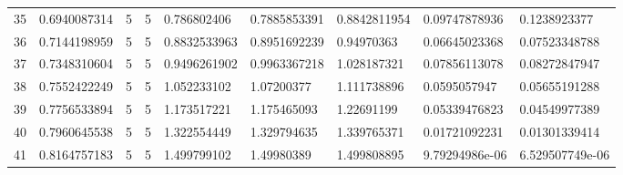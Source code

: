 \begin{tabular}{@{}lllllllll@{}}
35 & 0.6940087314 & 5 & 5 & 0.786802406 & 0.7885853391 & 0.8842811954 & 0.09747878936 & 0.1238923377 \\
36 & 0.7144198959 & 5 & 5 & 0.8832533963 & 0.8951692239 & 0.94970363 & 0.06645023368 & 0.07523348788 \\
37 & 0.7348310604 & 5 & 5 & 0.9496261902 & 0.9963367218 & 1.028187321 & 0.07856113078 & 0.08272847947 \\
38 & 0.7552422249 & 5 & 5 & 1.052233102 & 1.07200377 & 1.111738896 & 0.0595057947 & 0.05655191288 \\
39 & 0.7756533894 & 5 & 5 & 1.173517221 & 1.175465093 & 1.22691199 & 0.05339476823 & 0.04549977389 \\
40 & 0.7960645538 & 5 & 5 & 1.322554449 & 1.329794635 & 1.339765371 & 0.01721092231 & 0.01301339414 \\
41 & 0.8164757183 & 5 & 5 & 1.499799102 & 1.49980389 & 1.499808895 & 9.79294986e-06 & 6.529507749e-06 \\
\bottomrule
\end{tabular}
